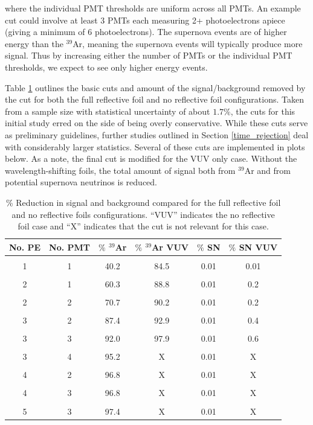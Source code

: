 \documentclass[a4paper]{article}
\begin{document}
\noindent where the individual PMT thresholds are uniform across all PMTs. An example cut could involve at least 3 PMTs each measuring 2+ photoelectrons apiece (giving a minimum of 6 photoelectrons). The supernova events are of higher energy than the $^{39}$Ar, meaning the supernova events will typically produce more signal. Thus by increasing either the number of PMTs or the individual PMT thresholds, we expect to see only higher energy events.

Table \ref{cuts_table} outlines the basic cuts and amount of the signal/background removed by the cut for both the full reflective foil and no reflective foil configurations. Taken from a sample size with statistical uncertainty of about $1.7\%$, the cuts for this initial study erred on the side of being overly conservative. While these cuts serve as preliminary guidelines, further studies outlined in Section \ref{time_rejection} deal with considerably larger statistics. Several of these cuts are implemented in plots below. As a note, the final cut is modified for the VUV only case. Without the wavelength-shifting foils, the total amount of signal both from $^{39}$Ar and from potential supernova neutrinos is reduced. 
 
\begin{table}[H]
	\begin{center}
	\begin{tabular}{| c | c || c | c || c | c |}
	\hline
	No. PE & No. PMT & $\%$ $^{39}$Ar & $\%$ $^{39}$Ar VUV & $\%$ SN & $\%$ SN VUV \\
	\hline
	 & & & & &\\
	 1 & 1 & 40.2  & 84.5 & 0.01 & 0.01\\
	 & & & & &\\
	 2 & 1 & 60.3 & 88.8 & 0.01 & 0.2\\
	 & & & & &\\
	 2 & 2 & 70.7 & 90.2 & 0.01 & 0.2\\
	  & & & & &\\
	 3 & 2 & 87.4 & 92.9 & 0.01 & 0.4\\
	 & & & & &\\
	 3 & 3 &  92.0 & 97.9 & 0.01 & 0.6\\
	 & & & & &\\
	 3 & 4 & 95.2 & X & 0.01 & X\\
	 & & & & &\\
	 4 & 2 & 96.8 & X & 0.01 & X\\
	 & & & & &\\
	 4 & 3 & 96.8 & X & 0.01 & X\\
	 & & & & &\\
	 5 & 3 & 97.4 & X & 0.01 & X\\
	\hline
	\end{tabular}
	\end{center}
	\caption{\% Reduction in signal and background compared for the full reflective foil and no reflective foils configurations. ``VUV'' indicates the no reflective foil case and ``X'' indicates that the cut is not relevant for this case.}\label{cuts_table}
	\end{table}
\end{document}
